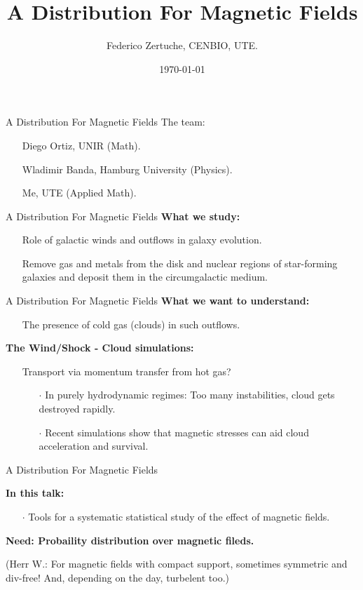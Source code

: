 \documentclass{beamer}
\title{A Distribution For Magnetic Fields}
\author{Federico Zertuche, CENBIO, UTE.}
\date{\today}
\begin{document}
\begin{frame}
\titlepage
\end{frame}

\begin{frame}{A Distribution For Magnetic Fields}
The team:
\begin{itemize}
  \item[] Diego Ortiz, UNIR (Math).
  \item[] Wladimir Banda, Hamburg University (Physics).
  \item[] Me, UTE (Applied Math).
\end{itemize}
\end{frame}


\begin{frame}{A Distribution For Magnetic Fields}
 \textbf{What we study:}
 \begin{itemize}
  \setlength\itemsep{1em}
  \item[] Role of galactic winds and outflows in galaxy evolution.
  \item[] Remove gas and metals from the disk and nuclear regions of star-forming galaxies and deposit them in the circumgalactic medium.
\end{itemize}
\end{frame}


\begin{frame}{A Distribution For Magnetic Fields}
  \textbf{What we want to understand:}
\begin{itemize}
  \setlength\itemsep{1em}
  \item[] The presence of cold gas (clouds) in such outflows.
\end{itemize}


\textbf{The Wind/Shock - Cloud simulations:}
\begin{itemize}
  \item[] Transport via momentum transfer from hot gas?
  \begin{itemize}
    \item[$\cdot$] In purely hydrodynamic regimes: Too many instabilities, cloud gets destroyed rapidly.
    \item[$\cdot$] Recent simulations show that magnetic stresses can aid cloud acceleration and survival.
  \end{itemize}
\end{itemize}
\end{frame}

\begin{frame}{A Distribution For Magnetic Fields}

  \textbf{In this talk:}
  \begin{itemize}
    \setlength\itemsep{1em}
    \item[$\cdot$] Tools for a systematic statistical study of the effect of magnetic fields.
  \end{itemize}

  \vspace{1em}
  \textbf{Need: Probaility distribution over magnetic fileds.}

  (Herr W.: For magnetic fields with compact support, sometimes symmetric and div-free! And, depending on the day, turbelent too.)

\end{frame}
\end{document}
